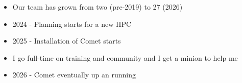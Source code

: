 \begin{frame}
			\vspace{4\baselineskip}	
	\begin{itemize}
		\item Our team has grown from two (pre-2019) to 27 (2026)
		\item 2024 - Planning starts for a new HPC
		\item 2025 - Installation of Comet starts 
		\item I go full-time on training and community and I get a minion to help me
		\item 2026 - Comet eventually up an running

	\end{itemize}
	\note{}

\end{frame}